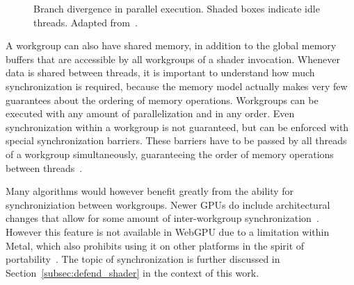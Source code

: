 \begin{figure}[ht]
\centering
{}
\caption{Branch divergence in parallel execution.
    Shaded boxes indicate idle threads. Adapted from~\cite{Hijma2023}.
}\label{fig:branching}
\end{figure}

A workgroup can also have shared memory,
in addition to the global memory buffers that are accessible by all workgroups
of a shader invocation.
Whenever data is shared between threads,
it is important to understand how much synchronization is required,
because the memory model actually makes very few guarantees about the ordering
of memory operations.
Workgroups can be executed with any amount of parallelization and in any order.
Even synchronization within a workgroup is not guaranteed,
but can be enforced with special synchronization barriers.
These barriers have to be passed by all threads of a workgroup simultaneously,
guaranteeing the order of memory operations between threads~\cite{wgsl_spec}.

Many algorithms would however benefit greatly from the ability for
synchroniziation between workgroups.
Newer GPUs do include architectural changes that allow for some amount of
inter-workgroup synchronization~\cite{Hijma2023}.
However this feature is not available in WebGPU due to a limitation within
Metal, which also prohibits using it on other platforms in the spirit of
portability~\cite{Levien2021}.
The topic of synchronization is further discussed in
Section~\ref{subsec:defend_shader} in the context of this work.
